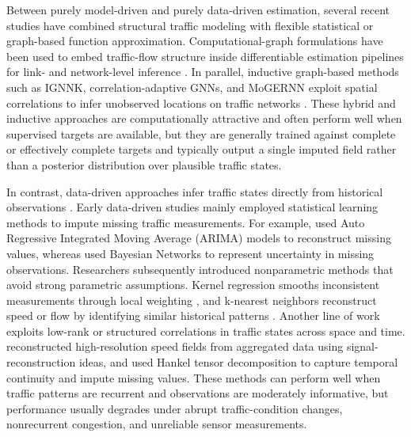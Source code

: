 \documentclass[a4paper,fleqn]{cas-sc}
\numberwithin{equation}{section}
\begin{document}
Between purely model-driven and purely data-driven estimation, several recent studies have combined structural traffic modeling with flexible statistical or graph-based function approximation. Computational-graph formulations have been used to embed traffic-flow structure inside differentiable estimation pipelines for link- and network-level inference \citep{ma2020estimating, guarda2025traffic}. In parallel, inductive graph-based methods such as IGNNK, correlation-adaptive GNNs, and MoGERNN exploit spatial correlations to infer unobserved locations on traffic networks \citep{wu2021inductive, nie2023towards, zhou2025mogernn}. These hybrid and inductive approaches are computationally attractive and often perform well when supervised targets are available, but they are generally trained against complete or effectively complete targets and typically output a single imputed field rather than a posterior distribution over plausible traffic states.

In contrast, data-driven approaches infer traffic states directly from historical observations \citep{seo2017traffic}. Early data-driven studies mainly employed statistical learning methods to impute missing traffic measurements. For example, \citet{zhong2004estimation} used Auto Regressive Integrated Moving Average (ARIMA) models to reconstruct missing values, whereas \citet{ni2005markov} used Bayesian Networks to represent uncertainty in missing observations. Researchers subsequently introduced nonparametric methods that avoid strong parametric assumptions. Kernel regression smooths inconsistent measurements through local weighting \citep{yin2012imputing}, and k-nearest neighbors reconstruct speed or flow by identifying similar historical patterns \citep{tak2016data}. Another line of work exploits low-rank or structured correlations in traffic states across space and time. \citet{coric2012traffic} reconstructed high-resolution speed fields from aggregated data using signal-reconstruction ideas, and \citet{wang2023low} used Hankel tensor decomposition to capture temporal continuity and impute missing values. These methods can perform well when traffic patterns are recurrent and observations are moderately informative, but performance usually degrades under abrupt traffic-condition changes, nonrecurrent congestion, and unreliable sensor measurements.
\end{document}
